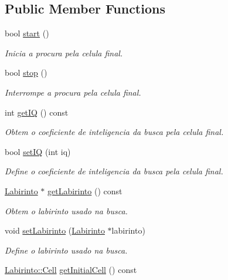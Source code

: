 \subsection*{Public Member Functions}
\begin{DoxyCompactItemize}
\item 
bool \hyperlink{class_path_finder_a_i_a2efb996de79146ca2cad3d61d19bd0c9}{start} ()
\begin{DoxyCompactList}\small\item\em Inicia a procura pela celula final. \end{DoxyCompactList}\item 
bool \hyperlink{class_path_finder_a_i_a26b87529dbb30a2c151af42a790e8f61}{stop} ()
\begin{DoxyCompactList}\small\item\em Interrompe a procura pela celula final. \end{DoxyCompactList}\item 
int \hyperlink{class_path_finder_a_i_af3abb07e07360f6e1b60b2b34c38e9e3}{get\+I\+Q} () const 
\begin{DoxyCompactList}\small\item\em Obtem o coeficiente de inteligencia da busca pela celula final. \end{DoxyCompactList}\item 
bool \hyperlink{class_path_finder_a_i_a3e53eb6b981c8721f9670470ea8f4c80}{set\+I\+Q} (int iq)
\begin{DoxyCompactList}\small\item\em Define o coeficiente de inteligencia da busca pela celula final. \end{DoxyCompactList}\item 
\hyperlink{class_labirinto}{Labirinto} $\ast$ \hyperlink{class_path_finder_a_i_aa1634bdbad590e159bcacd43d1a18468}{get\+Labirinto} () const 
\begin{DoxyCompactList}\small\item\em Obtem o labirinto usado na busca. \end{DoxyCompactList}\item 
void \hyperlink{class_path_finder_a_i_a2296c35be51fd6fdc6dd98bf6c344867}{set\+Labirinto} (\hyperlink{class_labirinto}{Labirinto} $\ast$labirinto)
\begin{DoxyCompactList}\small\item\em Define o labirinto usado na busca. \end{DoxyCompactList}\item 
\hyperlink{struct_labirinto_1_1_cell}{Labirinto\+::\+Cell} \hyperlink{class_path_finder_a_i_a7fe151b032792b40f7d2fa9acd33a01c}{get\+Initial\+Cell} () const 

\end{DoxyCompactItemize}

